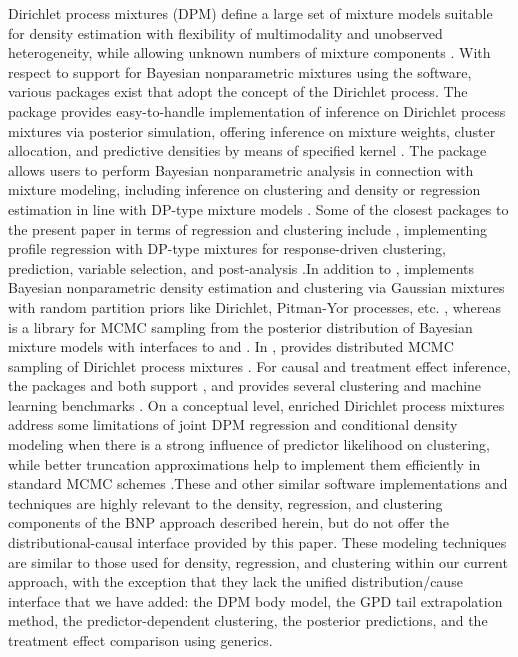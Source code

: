 \documentclass[article]{jss}\usepackage[]{graphicx}\usepackage[]{xcolor}
\begin{document}
Dirichlet process mixtures (DPM) define a large set of mixture
models suitable for density estimation with flexibility of multimodality
and unobserved heterogeneity, while allowing unknown numbers of mixture
components \citep{EscobarWest1995}. With respect to support for
Bayesian nonparametric mixtures using the  software, various
packages exist that adopt the concept of the Dirichlet process.
The package 
provides easy-to-handle implementation of inference on Dirichlet process
mixtures via posterior simulation, offering inference on mixture weights,
cluster allocation, and predictive densities by means of specified kernel
\citep{dirichletprocess_pkg}.
The package 
allows users to perform Bayesian nonparametric analysis in connection with
mixture modeling, including inference on clustering and density or
regression estimation in line with DP-type mixture models
\citep{canale2021BNPmix}.
Some of the closest packages to the present paper in terms of regression
and clustering include , implementing profile regression with
DP-type mixtures for response-driven clustering, prediction, variable
selection, and post-analysis \citep{PReMiuM_pkg}.In addition to ,  implements Bayesian nonparametric density estimation and clustering via Gaussian mixtures with random partition priors like Dirichlet, Pitman-Yor processes, etc. \citep{pyrichlet_pkg},
whereas  is a  library for MCMC sampling from
the posterior distribution of Bayesian mixture models with interfaces to
 and  \citep{BayesMix_pkg}. In ,
 provides distributed MCMC sampling of Dirichlet process mixtures \citep{DPMMSubClustersjl_pkg}.
For causal and treatment effect inference, the packages  and  both
support , and  provides several clustering and machine
learning benchmarks \citep{dowhy_pkg,econml_pkg,scikit_learn}.
On a conceptual level, enriched Dirichlet process mixtures address some limitations of
joint DPM regression and conditional density modeling when there is a strong influence of predictor
likelihood on clustering, while better truncation approximations help to implement them efficiently in standard MCMC schemes \citep{Wade2014EDP,BurnsDaniels2023EDPM}.These and other similar software implementations and techniques are highly relevant to
the density, regression, and clustering components of the BNP approach described herein,
but do not offer the distributional-causal interface provided by this paper.
These modeling techniques are similar to those used for density, regression, and clustering within our current approach,
with the exception that they lack the unified distribution/cause interface
that we have added: the DPM body model, the GPD tail extrapolation method, the predictor-dependent clustering, the posterior predictions, and the treatment effect comparison using  generics.
\end{document}
